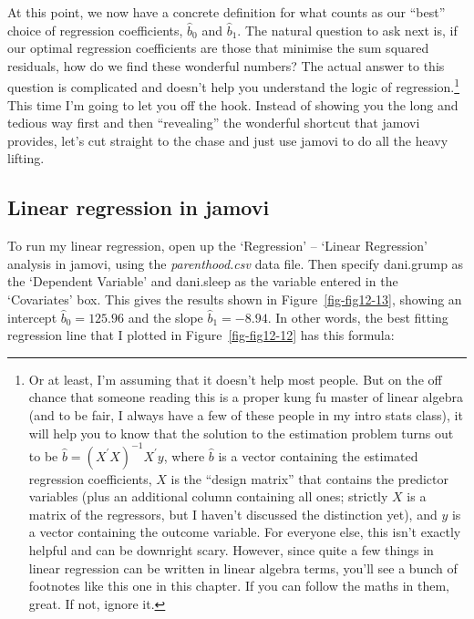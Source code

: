 \documentclass[
  a4paper,
]{book}
\begin{document}
At this point, we now have a concrete definition for what counts as our
``best'' choice of regression coefficients, \(\hat{b}_0\) and
\(\hat{b}_1\). The natural question to ask next is, if our optimal
regression coefficients are those that minimise the sum squared
residuals, how do we find these wonderful numbers? The actual answer to
this question is complicated and doesn't help you understand the logic
of regression.\footnote{Or at least, I'm assuming that it doesn't help
  most people. But on the off chance that someone reading this is a
  proper kung fu master of linear algebra (and to be fair, I always have
  a few of these people in my intro stats class), it will help you to
  know that the solution to the estimation problem turns out to be
  \(\hat{b} = (X^{'}X)^{-1}X^{'}y\), where \(\hat{b}\) is a vector
  containing the estimated regression coefficients, \(X\) is the
  ``design matrix'' that contains the predictor variables (plus an
  additional column containing all ones; strictly \(X\) is a matrix of
  the regressors, but I haven't discussed the distinction yet), and
  \(y\) is a vector containing the outcome variable. For everyone else,
  this isn't exactly helpful and can be downright scary. However, since
  quite a few things in linear regression can be written in linear
  algebra terms, you'll see a bunch of footnotes like this one in this
  chapter. If you can follow the maths in them, great. If not, ignore
  it.} This time I'm going to let you off the hook. Instead of showing
you the long and tedious way first and then ``revealing'' the wonderful
shortcut that jamovi provides, let's cut straight to the chase and just
use jamovi to do all the heavy lifting.

\hypertarget{linear-regression-in-jamovi}{%
\subsection{Linear regression in
jamovi}\label{linear-regression-in-jamovi}}

To run my linear regression, open up the `Regression' -- `Linear
Regression' analysis in jamovi, using the \emph{parenthood.csv} data
file. Then specify dani.grump as the `Dependent Variable' and dani.sleep
as the variable entered in the `Covariates' box. This gives the results
shown in Figure~\ref{fig-fig12-13}, showing an intercept
\(\hat{b}_0 = 125.96\) and the slope \(\hat{b}_1 = -8.94\). In other
words, the best fitting regression line that I plotted in
Figure~\ref{fig-fig12-12} has this formula:
\end{document}

